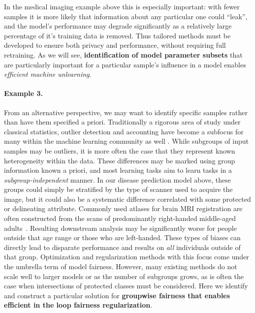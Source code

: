 In the medical imaging example above this is especially important: with fewer samples it is more likely that information about any particular one could ``leak'', and the model's performance may degrade significantly as a relatively large percentage of it's training data is removed.
Thus tailored methods must be developed to ensure both privacy and performance, without requiring full retraining.
As we will see, 
\textbf{identification of model parameter subsets}
that are particularly important
for a particular sample's influence
in a model enables \textit{efficient machine unlearning}.

\paragraph{Example 3.}
From an alternative perspective, we may want to identify specific samples rather than have them specified a priori.
Traditionally a rigorous area of study under classical statistics, outlier detection and accounting have become a subfocus for many within the machine learning community as well \citep{golatkar2020eternal,golatkar2020forgetting,huang2020feature,ren2019likelihood}.
While subgroups of input samples may be outliers, it is more often the case that they represent known heterogeneity within the data. 
These differences may be marked using 
group information known a priori, and 
most learning tasks aim to learn tasks
in a \textit{subgroup-independent} manner.
In our disease prediction model above,
these groups could simply be stratified by the type of scanner used to acquire the image, but it could also
be a systematic difference correlated with some protected or delineating attribute.
Commonly used atlases for brain MRI registration are often constructed
from the scans of predominantly right-handed middle-aged adults~\citep{FONOV2009S102}.
Resulting downstream analysis may be significantly worse
for people outside that age range or those who are left-handed.
These types of biases can directly lead to disparate performance and results on \textit{all} individuals outside of that group.
Optimization and regularization methods with this focus come under the umbrella term of model fairness.
However, many existing methods do not scale well to larger models or as the number of subgroups grows,
as is often the case when intersections of protected classes must be considered.
Here we identify and construct a particular solution for \textbf{groupwise fairness that enables efficient in the loop fairness regularization}.

